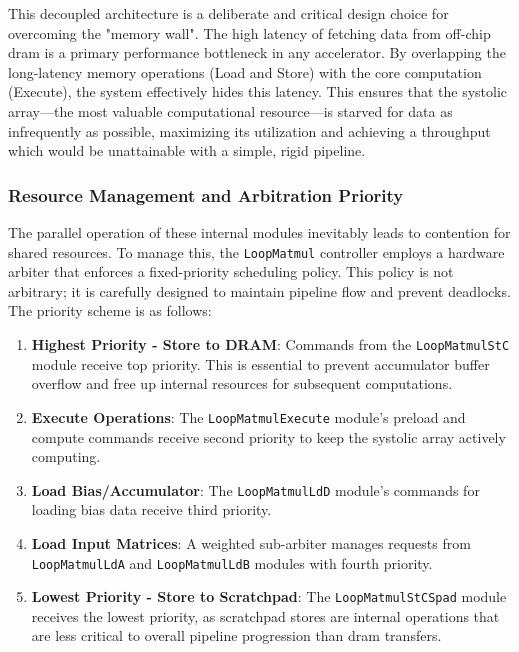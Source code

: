 This decoupled architecture is a deliberate and critical design choice for overcoming the "memory wall". The high latency of fetching data from off-chip \acrshort{dram} is a primary performance bottleneck in any accelerator. By overlapping the long-latency memory operations (Load and Store) with the core computation (Execute), the system effectively hides this latency. This ensures that the systolic array—the most valuable computational resource—is starved for data as infrequently as possible, maximizing its utilization and achieving a throughput which would be unattainable with a simple, rigid pipeline.

\subsubsection{Resource Management and Arbitration Priority}

The parallel operation of these internal modules inevitably leads to contention for shared resources. To manage this, the \texttt{LoopMatmul} controller employs a hardware arbiter that enforces a fixed-priority scheduling policy. This policy is not arbitrary; it is carefully designed to maintain pipeline flow and prevent deadlocks. The priority scheme is as follows:
\begin{enumerate}
    \item \textbf{Highest Priority - Store to DRAM}: Commands from the \texttt{LoopMatmulStC} module receive top priority. This is essential to prevent accumulator buffer overflow and free up internal resources for subsequent computations.
    \item \textbf{Execute Operations}: The \texttt{LoopMatmulExecute} module's preload and compute commands receive second priority to keep the systolic array actively computing.
    \item \textbf{Load Bias/Accumulator}: The \texttt{LoopMatmulLdD} module's commands for loading bias data receive third priority.
    \item \textbf{Load Input Matrices}: A weighted sub-arbiter manages requests from \texttt{Loop\allowbreak MatmulLdA} and \texttt{LoopMatmulLdB} modules with fourth priority.
    \item \textbf{Lowest Priority - Store to Scratchpad}: The \texttt{LoopMatmulStCSpad} module receives the lowest priority, as scratchpad stores are internal operations that are less critical to overall pipeline progression than \acrshort{dram} transfers.
\end{enumerate}

